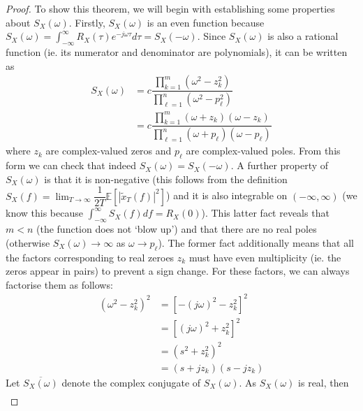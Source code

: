 \documentclass[11pt]{report} %
\begin{document}
\begin{proof}
To show this theorem, we will begin with establishing some properties about $S_{X}\left(\omega\right)$. Firstly, $S_{X}\left(\omega\right)$ is an even function because $S_{X}\left(\omega\right) = \int_{-\infty}^{\infty}R_{X}\left(\tau\right)e^{-j\omega\tau}d\tau = S_{X}\left(-\omega\right)$. Since $S_{X}\left(\omega\right)$ is also a rational function (ie. its numerator and denominator are polynomials), it can be written as
\begin{align}
S_{X}\left(\omega\right) &= c\dfrac{\prod_{k = 1}^{m}\left(\omega^{2} - z_{k}^{2}\right)}{\prod_{\ell = 1}^{n}\left(\omega^{2} - p_{\ell}^{2}\right)} \\
&= c\dfrac{\prod_{k = 1}^{m}\left(\omega + z_{k}\right)\left(\omega - z_{k}\right)}{\prod_{\ell = 1}^{n}\left(\omega + p_{\ell}\right)\left(\omega - p_{\ell}\right)}
\end{align}
where $z_{k}$ are complex-valued zeros and $p_{\ell}$ are complex-valued poles. From this form we can check that indeed $S_{X}\left(\omega\right) = S_{X}\left(-\omega\right)$. A further property of $S_{X}\left(\omega\right)$ is that it is non-negative (this follows from the definition $S_{X}\left(f\right) = \lim_{T\to\infty}\dfrac{1}{2T}\mathbb{E}\left[\left|\widetilde{x}_{T}\left(f\right)\right|^{2}\right]$) and it is also integrable on $\left(-\infty, \infty\right)$ (we know this because $\int_{-\infty}^{\infty}S_{X}\left(f\right)df = R_{X}\left(0\right)$). This latter fact reveals that $m < n$ (the function does not `blow up') and that there are no real poles (otherwise $S_{X}\left(\omega\right) \to \infty$ as $\omega \to p_{\ell}$). The former fact additionally means that all the factors corresponding to real zeroes $z_{k}$ must have even multiplicity (ie. the zeros appear in pairs) to prevent a sign change. For these factors, we can always factorise them as follows:
\begin{align}
\left(\omega^{2} - z_{k}^{2}\right)^{2} &= \left[-\left(j\omega\right)^{2} - z_{k}^{2}\right]^{2} \\
&= \left[\left(j\omega\right)^{2} + z_{k}^{2}\right]^{2} \\
&= \left(s^{2} + z_{k}^{2}\right)^{2} \\
&= \left(s + jz_{k}\right)\left(s - jz_{k}\right)
\end{align}
Let $\overline{S_{X}\left(\omega\right)}$ denote the complex conjugate of $S_{X}\left(\omega\right)$. As $S_{X}\left(\omega\right)$ is real, then
\begin{align}

\end{align}
\end{proof}
\end{document}
